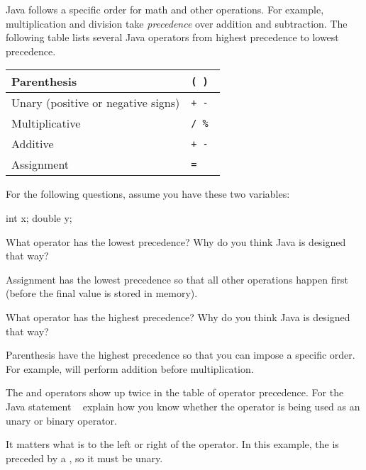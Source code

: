 

Java follows a specific order for math and other operations. For example, multiplication and division take \emph{precedence} over addition and subtraction.
The following table lists several Java operators from highest precedence to lowest precedence.

\begin{center}
\begin{tabular}{|L{3in}|L{1in}|}
\hline
Parenthesis
& \tt ( ) \\
\hline
Unary (positive or negative signs)
& \tt + - \\
\hline
Multiplicative
& \tt * / \% \\
\hline
Additive
& \tt + - \\
\hline
Assignment
& \tt = \\
\hline
\end{tabular}
\end{center}

For the following questions, assume you have these two variables:

\begin{javalst}
    int x;
    double y;
\end{javalst}




\Q What operator has the lowest precedence?
Why do you think Java is designed that way?

\begin{answer}
Assignment has the lowest precedence so that all other operations happen first (before the final value is stored in memory).
\end{answer}


\Q What operator has the highest precedence?
Why do you think Java is designed that way?

\begin{answer}
Parenthesis have the highest precedence so that you can impose a specific order.
For example,  will perform addition before multiplication.
\end{answer}


\Q The \java{+} and \java{-} operators show up twice in the table of operator precedence.
For the Java statement ~ explain how you know whether the \java{-} operator is being used as an unary or binary operator.

\begin{answer}
It matters what is to the left or right of the operator.
In this example, the \java{-} is preceded by a \java{*}, so it must be unary.
\end{answer}



